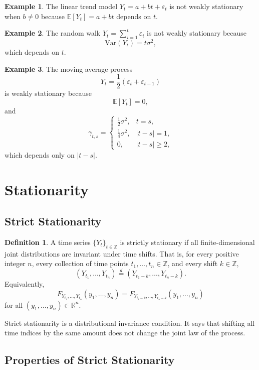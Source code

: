 \documentclass[12pt,oneside]{book}
\numberwithin{equation}{section}
\theoremstyle{definition}
\newtheorem{definition}{Definition}[section]
\newtheorem{example}{Example}[section]
\theoremstyle{plain}
\theoremstyle{remark}
\newcommand{\R}{\mathbb{R}}
\newcommand{\Z}{\mathbb{Z}}
\newcommand{\E}{\mathbb{E}}
\newcommand{\Var}{\mathrm{Var}}
\begin{document}
\begin{example}
The linear trend model $Y_t=a+bt+\varepsilon_t$ is not weakly stationary when $b\neq 0$ because $\E[Y_t]=a+bt$ depends on $t$.
\end{example}

\begin{example}
The random walk $Y_t=\sum_{i=1}^t\varepsilon_i$ is not weakly stationary because
\[
\Var(Y_t)=t\sigma^2,
\]
which depends on $t$.
\end{example}

\begin{example}
The moving average process
\[
Y_t=\frac{1}{2}(\varepsilon_t+\varepsilon_{t-1})
\]
is weakly stationary because
\[
\E[Y_t]=0,
\]
and
\[
\gamma_{t,s}
=
\begin{cases}
\frac{1}{2}\sigma^2, & t=s,\\
\frac{1}{4}\sigma^2, & |t-s|=1,\\
0, & |t-s|\geq 2,
\end{cases}
\]
which depends only on $|t-s|$.
\end{example}

\section{Stationarity}

\subsection{Strict Stationarity}

\begin{definition}
A time series $\{Y_t\}_{t\in\Z}$ is strictly stationary if all finite-dimensional joint distributions are invariant under time shifts. That is, for every positive integer $n$, every collection of time points $t_1,\ldots,t_n\in\Z$, and every shift $k\in\Z$,
\[
(Y_{t_1},\ldots,Y_{t_n})
\overset{d}{=}
(Y_{t_1-k},\ldots,Y_{t_n-k}).
\]
Equivalently,
\[
F_{Y_{t_1},\ldots,Y_{t_n}}(y_1,\ldots,y_n)
=
F_{Y_{t_1-k},\ldots,Y_{t_n-k}}(y_1,\ldots,y_n)
\]
for all $(y_1,\ldots,y_n)\in\R^n$.
\end{definition}

Strict stationarity is a distributional invariance condition. It says that shifting all time indices by the same amount does not change the joint law of the process.

\subsection*{Properties of Strict Stationarity}
\end{document}
